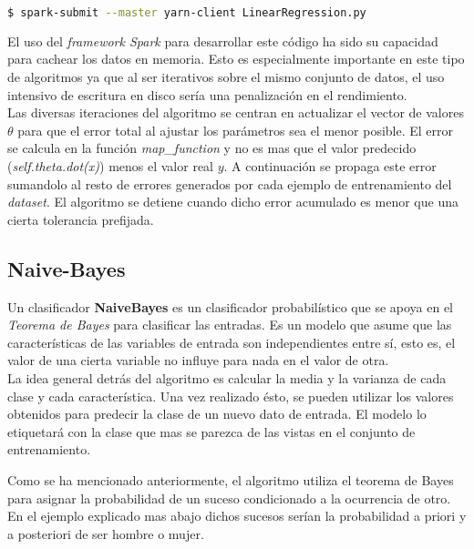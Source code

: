 \begin{lstlisting}[language=bash, numbers=none]
$ spark-submit --master yarn-client LinearRegression.py
\end{lstlisting}

El uso del \textit{framework Spark} para desarrollar este código ha sido su capacidad para cachear los datos en
memoria. Esto es especialmente importante en este tipo de algoritmos ya que al ser iterativos sobre el mismo
conjunto de datos, el uso intensivo de escritura en disco sería una penalización en el rendimiento.\\
Las diversas iteraciones del algoritmo se centran en actualizar el vector de valores $\theta$ para que el error
total al ajustar los parámetros sea el menor posible. El error se calcula en la función \textit{map\_function} 
y no es mas que el valor predecido (\textit{self.theta.dot(x)}) menos el valor real $y$. A continuación se propaga
este error sumandolo al resto de errores generados por cada ejemplo de entrenamiento del \textit{dataset}. El algoritmo
se detiene cuando dicho error acumulado es menor que una cierta tolerancia prefijada.

\clearpage

\subsection{Naive-Bayes}
Un clasificador \textbf{NaiveBayes} es un clasificador probabilístico que se apoya en el 
\textit{Teorema de Bayes} para clasificar las entradas.
Es un modelo que asume que las características de las variables de entrada son independientes 
entre sí, esto es, el valor de una cierta variable no influye para nada en el valor de otra.\\
La idea general detrás del algoritmo es calcular la media y la varianza de cada clase y cada característica.
Una vez realizado ésto, se pueden utilizar los valores obtenidos para predecir la clase de un nuevo 
dato de entrada. El modelo lo etiquetará con la clase que mas se parezca de las vistas en el 
conjunto de entrenamiento.
\newline

Como se ha mencionado anteriormente, el algoritmo utiliza el teorema de Bayes para asignar la probabilidad de
un suceso condicionado a la ocurrencia de otro. En el ejemplo explicado mas abajo dichos sucesos serían la
probabilidad a priori y a posteriori de ser hombre o mujer.


